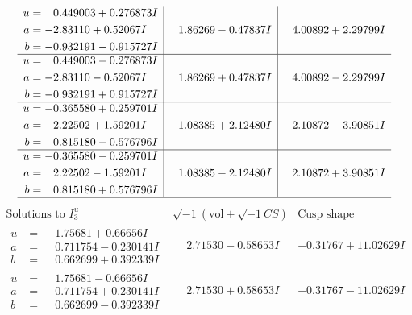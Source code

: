 \documentclass[1p]{elsarticle_modified}
\theoremstyle{definition}
\newcommand{\I}{\sqrt{-1}}
\begin{document}
$$\begin{array}{c|c|c}
\begin{aligned}
u &= \phantom{-}0.449003 + 0.276873 I \\
a &= -2.83110 + 0.52067 I \\
b &= -0.932191 - 0.915727 I\end{aligned}
 & \phantom{-}1.86269 - 0.47837 I & \phantom{-}4.00892 + 2.29799 I \\ \hline\begin{aligned}
u &= \phantom{-}0.449003 - 0.276873 I \\
a &= -2.83110 - 0.52067 I \\
b &= -0.932191 + 0.915727 I\end{aligned}
 & \phantom{-}1.86269 + 0.47837 I & \phantom{-}4.00892 - 2.29799 I \\ \hline\begin{aligned}
u &= -0.365580 + 0.259701 I \\
a &= \phantom{-}2.22502 + 1.59201 I \\
b &= \phantom{-}0.815180 - 0.576796 I\end{aligned}
 & \phantom{-}1.08385 + 2.12480 I & \phantom{-}2.10872 - 3.90851 I \\ \hline\begin{aligned}
u &= -0.365580 - 0.259701 I \\
a &= \phantom{-}2.22502 - 1.59201 I \\
b &= \phantom{-}0.815180 + 0.576796 I\end{aligned}
 & \phantom{-}1.08385 - 2.12480 I & \phantom{-}2.10872 + 3.90851 I\\
 \hline 
 \end{array}$$\newpage$$\begin{array}{c|c|c}  
\text{Solutions to }I^u_{3}& \I (\text{vol} + \sqrt{-1}CS) & \text{Cusp shape}\\
 \hline 
\begin{aligned}
u &= \phantom{-}1.75681 + 0.66656 I \\
a &= \phantom{-}0.711754 - 0.230141 I \\
b &= \phantom{-}0.662699 + 0.392339 I\end{aligned}
 & \phantom{-}2.71530 - 0.58653 I & -0.31767 + 11.02629 I \\ \hline\begin{aligned}
u &= \phantom{-}1.75681 - 0.66656 I \\
a &= \phantom{-}0.711754 + 0.230141 I \\
b &= \phantom{-}0.662699 - 0.392339 I\end{aligned}
 & \phantom{-}2.71530 + 0.58653 I & -0.31767 - 11.02629 I \\ \hline\begin{aligned}

\end{aligned}
\end{array}$$
\end{document}
